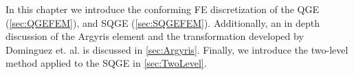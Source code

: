 In this chapter we introduce the conforming FE discretization of the QGE
(\autoref{sec:QGEFEM}), and SQGE (\autoref{sec:SQGEFEM}). Additionally, an in depth
discussion of the Argyris element and the transformation developed by Dominguez
et. al. \cite{Dominguez08} is discussed in \autoref{sec:Argyris}. Finally, we
introduce the two-level method applied to the SQGE in \autoref{sec:TwoLevel}.
